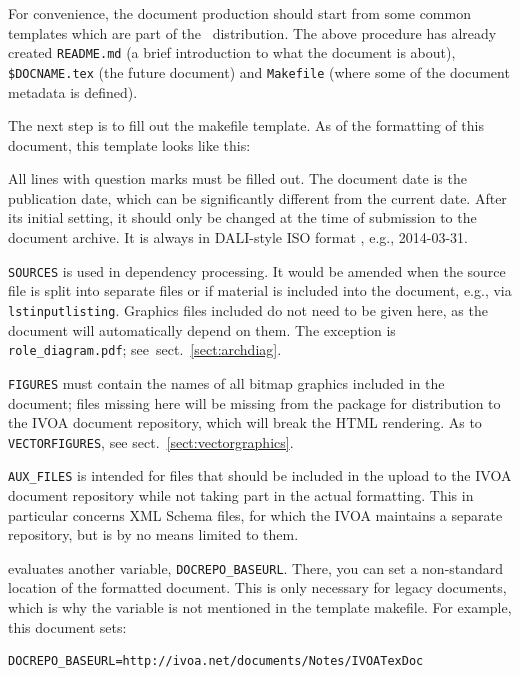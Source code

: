 \documentclass[11pt,a4paper]{ivoa}
\newcommand{\texword}[1]{\texttt{\color{texcolor} #1}}
\begin{document}
For convenience, the document production should start from some common
templates which are part of the \ivoatex\ distribution.  The above
procedure has already created \verb|README.md| (a brief introduction to
what the document is about), \verb|$DOCNAME.tex| (the future document)
and \verb|Makefile| (where some of the document metadata is defined).


The next step is to fill out the makefile template.
As of the formatting of this document, this template looks like this:



All lines with question marks must be filled out.  The document date
is the publication date, which can be significantly different from the
current date.  After its initial setting, it should only be changed at
the time of submission to the document archive.  It is always in
DALI-style ISO format \citep{2017ivoa.spec.0517D}, e.g., 2014-03-31.

\texttt{SOURCES} is used in dependency processing.  It would be amended
when the source file is split into separate files or if material is
included into the document, e.g., via \texword{lstinputlisting}.
Graphics files included do not need to be given here, as the document
will automatically depend on them.  The exception is
\verb|role_diagram.pdf|; see~sect.~\ref{sect:archdiag}.

\texttt{FIGURES} must contain the names of all bitmap graphics included
in the document; files missing here will be missing from the package for
distribution to the IVOA document repository, which will break the HTML
rendering.  As to \texttt{VECTORFIGURES}, see
sect.~\ref{sect:vectorgraphics}.

\texttt{AUX\_FILES} is intended for files that should be included in the
upload to the IVOA document repository while not taking part in the
actual formatting.  This in particular concerns XML Schema files, for
which the IVOA maintains a separate repository, but is by no means
limited to them.

\ivoatex{} evaluates another variable, \verb|DOCREPO_BASEURL|. There, you
can set a non-standard location of the formatted document.  This
is only necessary for legacy documents, which is why the variable is not
mentioned in the template makefile.  For example, this document sets:
\begin{lstlisting}
DOCREPO_BASEURL=http://ivoa.net/documents/Notes/IVOATexDoc
\end{lstlisting}
\end{document}
